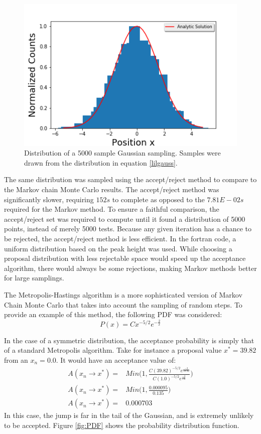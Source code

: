 \documentclass[twocolumn]{article}
\begin{document}
\begin{figure}
\centering
\includegraphics[width=\linewidth]{MCMChisto}
\caption{Distribution of a 5000 sample Gaussian sampling. Samples were drawn from the distribution in equation \ref{lilgauss}.}
\label{fig:MCMChisto}
\end{figure}

The same distribution was sampled using the accept/reject method to compare to the Markov chain Monte Carlo results. The accept/reject method was significantly slower, requiring $152s$ to complete as opposed to the $7.81E-02s$ required for the Markov method. To ensure a faithful comparison, the accept/reject set was required to compute until it found a distribution of 5000 points, instead of merely 5000 tests. Because any given iteration has a chance to be rejected, the accept/reject method is less efficient. In the fortran code, a uniform distribution based on the peak height was used. While choosing a proposal distribution with less rejectable space would speed up the acceptance algorithm, there would always be some rejections, making Markov methods better for large samplings.

The Metropolis-Hastings algorithm is a more sophisticated version of Markov Chain Monte Carlo that takes into account the sampling of random steps. To provide an example of this method, the following PDF was considered:
\begin{equation}
P(x) = Cx^{-5/2}e^{-\frac{2}{x}}
\label{PDF}
\end{equation}

In the case of a symmetric distribution, the acceptance probability is simply that of a standard Metropolis algorithm. Take for instance a proposal value $x^* = 39.82$ from an $x_n=0.0$. It would have an acceptance value of:
\begin{equation}
\begin{split}
A(x_n \to x^*) =& Min \Bigg( 1, \frac{C(39.82)^{-5/2}e^{\frac{-2}{39.82}}}{C(1.0)^{-5/2}e^{\frac{-2}{1.0}}} \Bigg) \\
A(x_n \to x^*) =& Min \Bigg( 1, \frac{0.000095}{0.135} \Bigg) \\
A(x_n \to x^*) =& 0.000703
\end{split}
\end{equation}
In this case, the jump is far in the tail of the Gaussian, and is extremely unlikely to be accepted. Figure \ref{fig:PDF} shows the probability distribution function.
\end{document}
